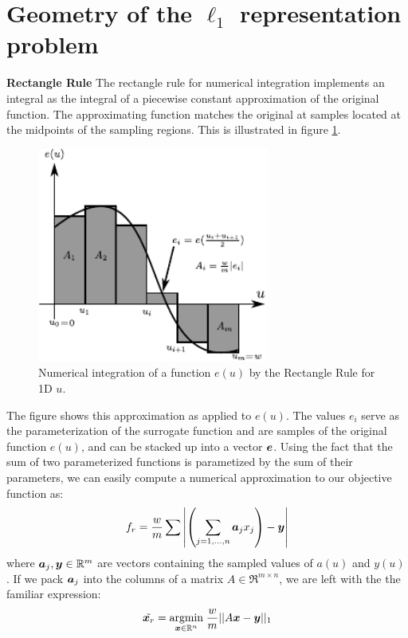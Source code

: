 \section{Geometry of the $\ell_1$ representation problem}
{\bf Rectangle Rule} 
%
The rectangle rule for numerical integration implements an
integral as the integral of a piecewise constant approximation of the original
function.  The approximating function matches the original at samples located
at the midpoints of the sampling regions. This is illustrated in figure
\ref{fig:rectangle}.
%
\begin{figure}
 \centering
 \includegraphics[width=3in]{figures_subgradient/integration_rectangle_midpoint.pdf}
 \caption{Numerical integration of a function $e(u)$ by the Rectangle Rule for 1D $u$.}
 \label{fig:rectangle}
\end{figure}
%
The figure shows this approximation as applied to $e(u)$. The values $e_i$ serve as the parameterization of the surrogate function and are samples of the original function $e(u)$, and can be stacked up into a vector $\boldsymbol{e}$.  Using the fact that the sum of two parameterized functions is parametized by the sum of their parameters, we can easily compute a numerical approximation to our objective function as:
%
\begin{equation}\label{eqn:discrete1DBox}
f_r = \frac{w}{m} \sum{ \left|\left(\sum_{j=1,\ldots,n} \boldsymbol{a}_j x_j\right) - {\boldsymbol{y}}\right|}
\end{equation}
%
where $\boldsymbol{a}_j, {\boldsymbol{y}} \in \mathbb R^m$ are vectors containing the sampled values of $a(u)$ and $y(u)$.  If we pack $\boldsymbol{a}_j$ into the columns of a matrix $A \in \Re^{m \times n}$, we are left with the the familiar expression:
%
\begin{equation}
\label{eqn:original_formulation}
\tilde{{\boldsymbol{x}}_r} = {\hbox{$\underset{{\boldsymbol{x}}\in \mathbb R^n}{\mbox{argmin}}\;$}} \frac{w}{m} || A {\boldsymbol{x}} - {\boldsymbol{y}} ||_1
\end{equation}
